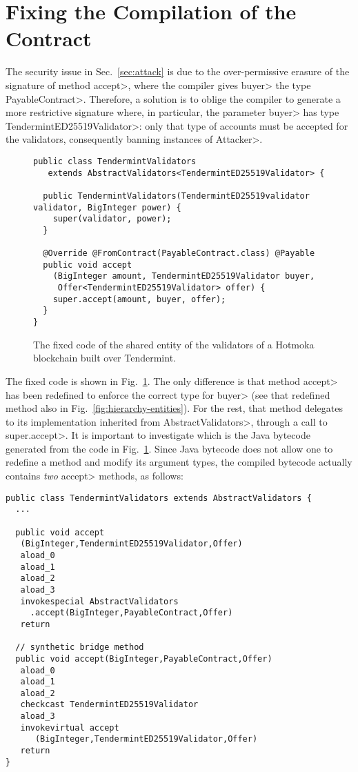 \section{Fixing the Compilation of the Contract} \label{sec:fix}

The security issue in Sec.~\ref{sec:attack} is due to the
over-permissive erasure of the signature of method \<accept>,
where the compiler gives \<buyer> the type \<PayableContract>.
Therefore, a solution is to oblige the compiler to generate a more
restrictive signature where, in particular, the parameter \<buyer>
has type \<TendermintED25519Validator>: only that type of accounts
must be accepted for the validators, consequently banning instances of \<Attacker>.

\begin{figure}[t]
  \begin{center}
    \begin{lstlisting}[language=Takamaka]
public class TendermintValidators
   extends AbstractValidators<TendermintED25519Validator> {

  public TendermintValidators(TendermintED25519validator validator, BigInteger power) {
    super(validator, power);
  }

  @Override @FromContract(PayableContract.class) @Payable
  public void accept
    (BigInteger amount, TendermintED25519Validator buyer, 
     Offer<TendermintED25519Validator> offer) {
    super.accept(amount, buyer, offer);
  }
}
    \end{lstlisting}
  \end{center}
  \caption{The fixed code of the shared entity of the validators of a Hotmoka blockchain built over Tendermint.}\label{fig:solution}
\end{figure}

The fixed code is shown in Fig.~\ref{fig:solution}. The only difference is that method
\<accept> has been redefined to enforce the correct type for \<buyer>
(see that redefined method also in Fig.~\ref{fig:hierarchy-entities}). For the rest, that method
delegates to its implementation inherited from \<AbstractValidators>, through a call
to \<super.accept>.
It is important to investigate which is the Java bytecode generated from
the code in Fig.~\ref{fig:solution}. Since Java bytecode does not allow one to redefine a method
and modify its argument types, the compiled bytecode actually contains \emph{two}
\<accept> methods, as follows:

\begin{lstlisting}[language=JavaBytecode]
public class TendermintValidators extends AbstractValidators {
  ...
  
  public void accept
   (BigInteger,TendermintED25519Validator,Offer)
   aload_0
   aload_1
   aload_2
   aload_3
   invokespecial AbstractValidators
     .accept(BigInteger,PayableContract,Offer)
   return

  // synthetic bridge method
  public void accept(BigInteger,PayableContract,Offer)
   aload_0
   aload_1
   aload_2
   checkcast TendermintED25519Validator
   aload_3
   invokevirtual accept
      (BigInteger,TendermintED25519Validator,Offer)
   return
}
\end{lstlisting}

